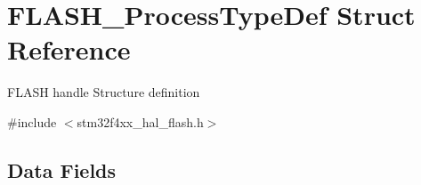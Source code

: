 \hypertarget{struct_f_l_a_s_h___process_type_def}{}\section{F\+L\+A\+S\+H\+\_\+\+Process\+Type\+Def Struct Reference}
\label{struct_f_l_a_s_h___process_type_def}


F\+L\+A\+SH handle Structure definition ~\newline
  




{\ttfamily \#include $<$stm32f4xx\+\_\+hal\+\_\+flash.\+h$>$}

\subsection*{Data Fields}
